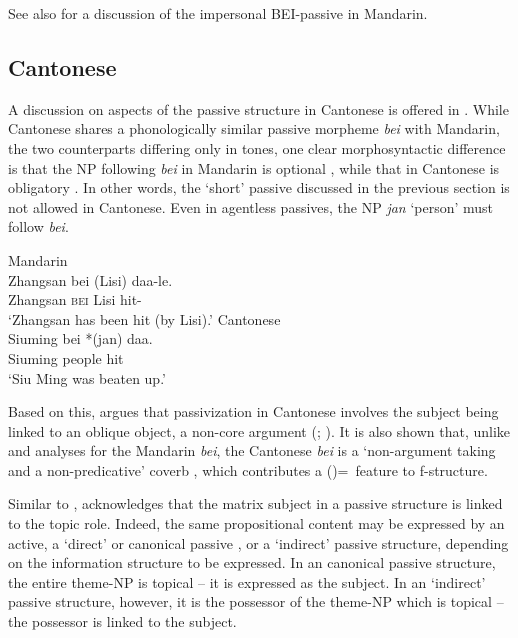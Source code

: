 \documentclass[output=paper,chinesefont,hidelinks]{langscibook}
\begin{document}
See also \citet{Yang2020} for a discussion of the impersonal BEI-passive in Mandarin.

\subsection{Cantonese}
\label{sec:Sinitic:4.1.2}

A discussion on aspects of the passive structure in Cantonese is offered in \citet{Chow2019}. While Cantonese shares a phonologically similar passive morpheme \textit{bei} with Mandarin, the two counterparts differing only in tones, one clear morphosyntactic difference is that the NP following \textit{bei} in Mandarin is optional , while that in Cantonese is obligatory . In other words, the `short' passive discussed in the previous section is not allowed in Cantonese. Even in agentless passives, the NP \textit{jan} `person' must follow \textit{bei}.

\ea%
    \label{ex:Sinitic:40}
    \ea\label{ex:Sinitic:40a} Mandarin\\
    \gll Zhangsan  bei  (Lisi)   daa-le.\\
         Zhangsan   \textsc{bei}   {\db}Lisi   hit-{\PFV}\\
    \glt`Zhangsan has been hit (by Lisi).'
    \ex\label{ex:Sinitic:40b}Cantonese\\
    \gll Siuming  bei  *(jan)  daa.\\
         Siuming   {\PASS}  {\db\db}people   hit\\
    \glt`Siu Ming was beaten up.'
    \z\z

\noindent  Based on this, \citet{Chow2019} argues that passivization in Cantonese involves the subject being linked to an oblique object, a non-core argument (\citealt{bresnan1982the-passive}; \citealt[232]{Chow2019}). It is also shown that, unlike  and  analyses for the Mandarin \textit{bei}, the Cantonese \textit{bei} is a `non-argument taking and a non-predicative' coverb \citep[186]{Chow2019}, which contributes a (\UP\VOICE)=\PASS\ feature to f-structure.

  Similar to \citet{Her2009}, \citet{Chow2019} acknowledges that the matrix subject in a passive structure is linked to the topic role. Indeed, the same propositional content may be expressed by an active, a `direct' or canonical passive , or a `indirect' passive  structure, depending on the information structure to be expressed. In an canonical passive structure, the entire theme-NP is topical – it is expressed as the subject. In an `indirect' passive structure, however, it is the possessor of the theme-NP which is topical – the possessor is linked to the subject.
\end{document}
